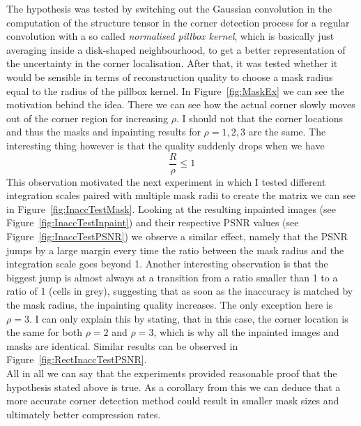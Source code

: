 The hypothesis was tested by switching out the Gaussian
convolution in the computation of the structure tensor in the corner detection process for a
regular convolution with a so called \textit{normalised pillbox kernel}, which is basically just
averaging inside a disk-shaped neighbourhood, to get a better representation of the uncertainty in
the corner localisation\cite{conversation}. After that, it was tested whether it would be
sensible in terms of reconstruction quality to choose a mask radius equal to the radius of the
pillbox kernel\cite{conversation}. 
In Figure~\ref{fig:MaskEx} we can see the motivation behind the
idea. There we can see how the actual corner slowly moves out of the corner region for increasing
$\rho$. I should not that the corner locations and thus the masks and inpainting results for
$\rho=1,2,3$ are the same. The interesting thing however is that the quality suddenly drops when we 
have 
\begin{equation}
    \frac{R}{\rho}\leq1
\end{equation}
This observation motivated the next experiment in which I tested different integration scales
paired with multiple mask radii to create the matrix we can see in Figure~\ref{fig:InaccTestMask}.
Looking at the resulting inpainted images (see Figure~\ref{fig:InaccTestInpaint}) and their
respective PSNR values (see Figure~\ref{fig:InaccTestPSNR}) we observe a similar effect, namely
that the PSNR jumps by a large margin every time the ratio between the mask radius and the
integration scale goes beyond 1. 
Another interesting observation is that the biggest jump is almost
always at a transition from a ratio smaller than 1 to a ratio of 1 (cells in grey), suggesting that
as soon as the inaccuracy is matched by the mask radius, the inpainting quality increases. The only
exception here is $\rho=3$. I can only explain this by stating, that in this case, the corner
location is the same for both $\rho=2$ and $\rho=3$, which is why all the inpainted images and
masks are identical. Similar results can be observed in Figure~\ref{fig:RectInaccTestPSNR}.\\
All in all we can say that the experiments provided reasonable proof that the hypothesis stated
above is true. As a corollary from this we can deduce that a more accurate corner detection method
could result in smaller mask sizes and ultimately better compression rates.
